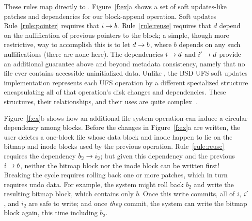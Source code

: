 These rules map directly to \Featherstitch.
%
Figure~\ref{f:ex}a shows a set of soft updates-like patches and dependencies for
 our block-append operation.
%
%
%
%
Soft updates Rule~\ref{rule:pointer} requires that $i \rightarrow b$.
%
Rule~\ref{rule:reuse} requires that $d$ depend on the nullification of previous pointers to the
 block;
%
a simple, though more restrictive, way to accomplish this is to let $d
 \rightarrow b$, where $b$ depends on any such nullifications
 (there are none here).
%
The dependencies $i \rightarrow d$ and $i' \rightarrow d$ provide an
 additional guarantee above and beyond metadata consistency, namely
 that no file ever contains accessible uninitialized data.
%
%
Unlike \Featherstitch, the BSD UFS soft updates implementation represents each UFS
 operation by a different specialized structure encapsulating
 all of that operation's disk changes and dependencies.
These structures, their
relationships, and their uses %
are quite complex~\cite{mckusick99soft}.

\begin{comment}
\begin{figure}[htb]
  \centering
  \texttt{[image: fig/examplesb\_3]}
  \caption{\label{fig:softupdate} Soft updates \patches\
  for appending one block to an empty file in an FFS-like file system.}
\end{figure}
\end{comment}

Figure~\ref{f:ex}b shows how an additional file system operation can induce
 a circular dependency among blocks.
%
Before the changes in Figure~\ref{f:ex}a are written, the user deletes a
 one-block file whose data block and inode happen to lie on the bitmap
 and inode blocks used by the previous operation.
%
Rule~\ref{rule:reuse} requires the dependency $b_2 \rightarrow i_2$; but
 given this dependency and the previous $i \rightarrow b$, neither the bitmap
 block nor the inode block can be written first!
%
Breaking the cycle requires rolling back one or more patches, which in turn
 requires undo data.
%
For example, the system might roll back $b_2$ and write the resulting
 bitmap block, which contains only
 $b$.  Once this write commits, all of $i$, $i'$, and
 $i_2$ are safe to write; and once \emph{they} commit, the system can write
 the bitmap block again, this time including $b_2$.


